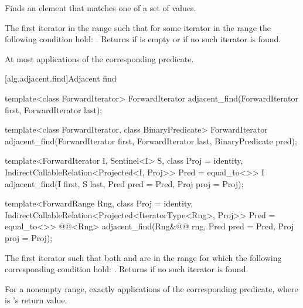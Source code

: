 \begin{itemdescr}
\pnum
\effects
Finds an element that matches one of a set of values.

\pnum
\returns
The first iterator
in the range 
such that for some
iterator
in the range 
the following condition hold:
.
Returns 
if  is empty or if
no such iterator is found.

\pnum
\complexity
At most
applications of the corresponding predicate.
\end{itemdescr}

[alg.adjacent.find]{Adjacent find}

%
\begin{removedblock}
\begin{itemdecl}
template<class ForwardIterator>
  ForwardIterator adjacent_find(ForwardIterator first, ForwardIterator last);

template<class ForwardIterator, class BinaryPredicate>
  ForwardIterator adjacent_find(ForwardIterator first, ForwardIterator last,
                              BinaryPredicate pred);
\end{itemdecl}
\end{removedblock}
\begin{addedblock}
\begin{itemdecl}
template<ForwardIterator I, Sentinel<I> S, class Proj = identity,
    IndirectCallableRelation<Projected<I, Proj>> Pred = equal_to<>>
  I
    adjacent_find(I first, S last, Pred pred = Pred{},
                  Proj proj = Proj{});

template<ForwardRange Rng, class Proj = identity,
    IndirectCallableRelation<Projected<IteratorType<Rng>, Proj>> Pred = equal_to<>>
  @@<Rng>
    adjacent_find(Rng&@\newtxt{\&}@ rng, Pred pred = Pred{}, Proj proj = Proj{});
\end{itemdecl}
\end{addedblock}

\begin{itemdescr}
\pnum
\returns
The first iterator
such that both
and
are in
the range
for which
the following corresponding condition hold:
.
Returns 
if no such iterator is found.

\pnum
\complexity
For a nonempty range, exactly
applications of the corresponding predicate, where  is
's
return value.
\end{itemdescr}

